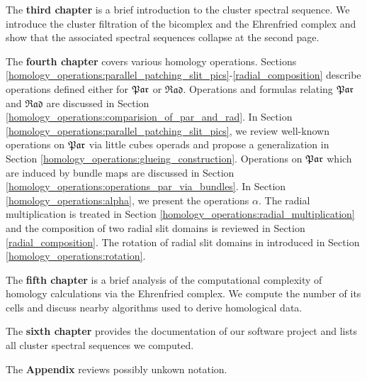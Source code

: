 The {\bfseries third chapter} is a brief introduction to the cluster spectral sequence.
We introduce the cluster filtration of the bicomplex and the Ehrenfried complex and show that the associated spectral sequences collapse at the second page.

The {\bfseries fourth chapter} covers various homology operations.
Sections \ref{homology_operations:parallel_patching_slit_pics}-\ref{radial_composition} describe operations defined either for $\mathfrak{Par}$ or $\mathfrak{Rad}$.
Operations and formulas relating $\mathfrak{Par}$ and $\mathfrak{Rad}$ are discussed in Section \ref{homology_operations:comparision_of_par_and_rad}.
In Section \ref{homology_operations:parallel_patching_slit_pics}, we review well-known operations on $\mathfrak{Par}$ via little cubes operads and propose a generalization in Section \ref{homology_operations:glueing_construction}.
Operations on $\mathfrak{Par}$ which are induced by bundle maps are discussed in Section \ref{homology_operations:operations_par_via_bundles}.
In Section \ref{homology_operations:alpha}, we present the operations $\alpha$.
The radial multiplication is treated in Section \ref{homology_operations:radial_multiplication} and
the composition of two radial slit domains is reviewed in Section \ref{radial_composition}.
The rotation of radial slit domains in introduced in Section \ref{homology_operations:rotation}.

The {\bfseries fifth chapter} is a brief analysis of the computational complexity of homology calculations via the Ehrenfried complex.
We compute the number of its cells and discuss nearby algorithms used to derive homological data.

The {\bfseries sixth chapter} provides the documentation of our software project and lists all cluster spectral sequences we computed.

The {\bfseries Appendix} reviews possibly unkown notation.